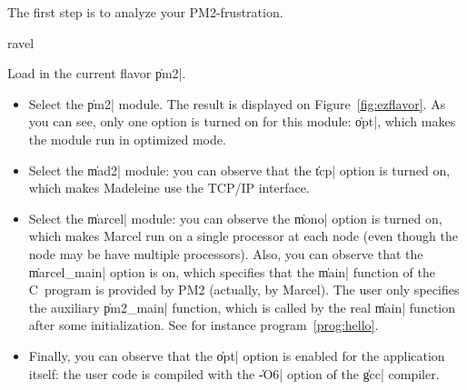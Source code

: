 The first step is to analyze your PM2-frustration. 
\begin{shell}
ravel%
\end{shell}
Load in the current flavor \|pm2|.
\begin{itemize}
  
\item Select the \|pm2| module. The result is displayed on
  Figure~\ref{fig:ezflavor}. As you can see, only one option is turned
  on for this module: \|opt|, which makes the module run in optimized
  mode. 
  
\item Select the \|mad2| module: you can observe that the \|tcp|
  option is turned on, which makes Madeleine use the TCP/IP interface.
  
\item Select the \|marcel| module: you can observe the \|mono| option
  is turned on, which makes Marcel run on a single processor at each
  node (even though the node may be have multiple processors). Also,
  you can observe that the \|marcel_main| option is on, which
  specifies that the \|main| function of the C~program is provided by
  PM2 (actually, by Marcel). The user only specifies the auxiliary
  \|pm2_main| function, which is called by the real \|main| function
  after some initialization. See for instance
  program~\ref{prog:hello}.
  
\item Finally, you can observe that the \|opt| option is enabled for
  the application itself: the user code is compiled with the
  \|-O6| option of the \|gcc| compiler.

\end{itemize}

